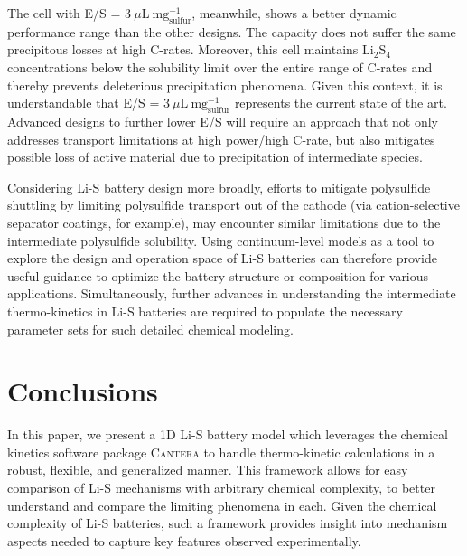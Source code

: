 \documentclass{elsarticle}
\begin{document}
The cell with E/S = $3~\mu\mathrm{L} ~ \mathrm{mg}^{-1}_\mathrm{sulfur}$, meanwhile, shows a better dynamic performance range than the other designs. The capacity does not suffer the same precipitous losses at high C-rates.  Moreover, this cell maintains Li$_2$S$_4$ concentrations below the solubility limit over the entire range of C-rates and thereby prevents deleterious precipitation phenomena. Given this context, it is understandable that E/S = $3~\mu\mathrm{L} ~ \mathrm{mg}^{-1}_\mathrm{sulfur}$ represents the current state of the art. Advanced designs to further lower E/S will require an approach that not only addresses transport limitations at high power/high C-rate, but also mitigates possible loss of active material due to precipitation of intermediate species.

Considering Li-S battery design more broadly, efforts to mitigate polysulfide shuttling by limiting polysulfide transport out of the cathode (via cation-selective separator coatings, for example), may encounter similar limitations due to the intermediate polysulfide solubility.  Using continuum-level models as a tool to explore the design and operation space of Li-S batteries can therefore provide useful guidance to optimize the battery structure or composition for various applications. Simultaneously, further advances in understanding the intermediate thermo-kinetics in Li-S batteries are required to populate the necessary parameter sets for such detailed chemical modeling. 

\section{Conclusions}

In this paper, we present a 1D Li-S battery model which leverages the chemical kinetics software package \textsc{Cantera} to handle thermo-kinetic calculations in a robust, flexible, and generalized manner.  This framework allows for easy comparison of Li-S mechanisms with arbitrary chemical complexity, to better understand and compare the limiting phenomena in each. Given the chemical complexity of Li-S batteries, such a framework provides insight into mechanism aspects needed to capture key features observed experimentally. 
\end{document}
